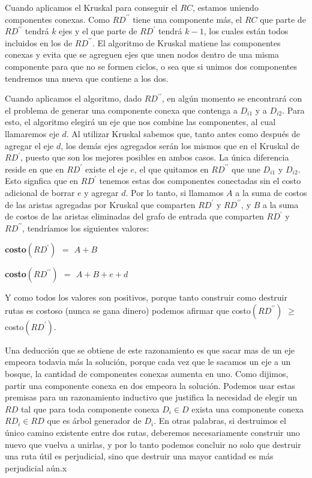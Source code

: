\begin{enumerate}
Cuando aplicamos el Kruskal para conseguir el $RC$, estamos uniendo componentes conexas. Como $RD^{\prime\prime}$ tiene una componente más, el $RC$ que parte de $RD^{\prime\prime}$ tendrá $k$ ejes y el que parte de $RD^{\prime}$ tendrá $k-1$, los cuales están todos incluidos en los de $RD^{\prime\prime}$. El algoritmo de Kruskal matiene las componentes conexas y evita que se agreguen ejes que unen nodos dentro de una misma componente para que no se formen ciclos, o sea que si unimos dos componentes tendremos una nueva que contiene a los dos.

Cuando aplicamos el algoritmo, dado $RD^{\prime\prime}$, en algún momento se encontrará con el problema de generar una componente conexa que contenga a $D_{i1}$  y a $D_{i2}$. Para esto, el algoritmo elegirá un eje que nos combine las componentes, al cual llamaremos eje $d$. Al utilizar Kruskal sabemos que, tanto antes como después de agregar el eje $d$, los demás ejes agregados serán los mismos que en el Kruskal de $RD^{\prime}$, puesto que son los mejores posibles en ambos casos. La única diferencia reside en que en $RD^{\prime}$ existe el eje $e$, el que quitamos en $RD^{\prime\prime}$ que une $D_{i1}$ y $D_{i2}$. Esto signfica que en $RD^{\prime}$ tenemos estas dos componentes conectadas sin el costo adicional de borrar $e$ y agregar $d$. Por lo tanto, si llamamos $A$ a la suma de costos de las aristas agregadas por Kruskal que comparten $RD^{\prime}$ y $RD^{\prime\prime}$, y $B$ a la suma de costos de las aristas eliminadas del grafo de entrada que comparten $RD^{\prime}$ y $RD^{\prime\prime}$, tendríamos los siguientes valores:

\begin{center}
	\textbf{costo$(RD^{\prime})$ $=$ $A + B$}

	\textbf{costo$(RD^{\prime\prime})$ $=$ $A + B + e + d$}
	
\end{center}

Y como todos los valores son positivos, porque tanto construir como destruir rutas es costoso (nunca se gana dinero) podemos afirmar que
costo$(RD^{\prime\prime})$ $\geq$ costo$(RD^{\prime})$.

Una deducción que se obtiene de este razonamiento es que sacar mas de un eje empeora todavia más la solución, porque cada vez que le sacamos un eje a un bosque, la cantidad de componentes conexas aumenta en uno. Como dijimos, partir una componente conexa en dos empeora la solución. Podemos usar estas premisas para un razonamiento inductivo que justifica la necesidad de elegir un $RD$ tal que para toda componente conexa $D_i \in D$ exista una componente conexa $RD_i \in RD$ que es árbol generador de $D_i$. En otras palabras, si destruimos el único camino existente entre dos rutas, deberemos necesariamente construir uno nuevo que vuelva a unirlas, y por lo tanto podemos concluir no solo que destruir una ruta útil es perjudicial, sino que destruir una mayor cantidad es más perjudicial aún.x


\end{enumerate}

